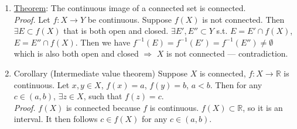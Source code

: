\documentclass[%
 aip,
 jmp,%
 amsmath,amssymb,
 reprint,%
]{revtex4-1}
\def\R{{\mathbb R}}
\def\Ra{\Rightarrow}
\renewenvironment{proof}{\color{gray}\footnotesize\emph{Proof.}}{}
\newcommand{\defn}[1]{\underline{#1}}
\begin{document}
\begin{enumerate}
    \item \defn{Theorem}: The continuous image of a connected set is connected.\\
        \begin{proof}
            Let $f: X \to Y$ be continuous. Suppose $f(X)$ is not connected.
            Then $\exists E\subset f(X)$ that is both open and closed.
            $\exists E', E'' \subset Y$ s.t. $E=E'\cap f(X)$, $E = E''\cap f(X)$.
            Then we have $f^{-1}(E) = f^{-1}(E') = f^{-1}(E'') \neq \emptyset$
            which is also both open and closed $\Ra$ $X$ is not connected ---
            contradiction.
        \end{proof}

    \item Corollary (Intermediate value theorem) Suppose $X$ is connected,
    $f: X \to \R$ is continuous. Let $x,y\in X$, $f(x)=a$, $f(y)=b$, $a<b$.
    Then for any $c\in (a,b)$, $\exists z \in X$, such that $f(z)=c$. \\
        \begin{proof}
            $f(X)$ is connected because $f$ is continuous. $f(X)\subset\R$,
            so it is an interval. It then follows $c\in f(X)$ for any
            $c \in (a,b)$.
        \end{proof}
\end{enumerate}
\end{document}
